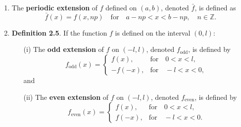 \begin{enumerate}
\item The \textbf{periodic extension} of $f$ defined on $(a,b)$, denoted $\bar f$, is defined as
\[\bar f(x)=f(x,np) \quad \text{for} \quad a-np<x<b-np, \quad n \in \mathbb{Z}. \]


\item \textbf{Definition 2.5}. If the function $f$ is defined on the interval $(0, l)$:

\begin{itemize}
\item[(i)] The \textbf{odd extension} of $f$ on $(-l,l)$, denoted $f_{\text{odd}}$, is defined by
\begin{equation*}
    f_{\text{odd}}(x)=
    \begin{cases}
        f(x), & \text{for} \quad 0<x<l, \\
        -f(-x), & \text{for} \quad -l<x<0,
    \end{cases}
\end{equation*}
and

\item[(ii)] The \textbf{even extension} of $f$ on $(-l,l)$, denoted $f_{\text{even}}$, is defined by
\begin{equation*}
    f_{\text{even}}(x)=
    \begin{cases}
        f(x), & \text{for} \quad 0<x<l, \\
        f(-x), & \text{for} \quad -l<x<0.
    \end{cases}
\end{equation*}

\end{itemize}

% 
% 


\end{enumerate}
